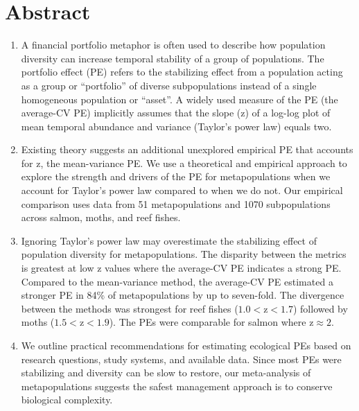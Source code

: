 %

\section{Abstract}
\begin{enumerate}
 \item A financial portfolio metaphor is often used to describe how population
   diversity can increase temporal stability of a group of populations. The
   portfolio effect (PE) refers to the stabilizing effect from a population
   acting as a group or ``portfolio'' of diverse subpopulations instead of a
   single homogeneous population or ``asset''. A widely used measure of the PE
   (the average-CV PE) implicitly assumes that the slope (z) of a log-log plot
   of mean temporal abundance and variance (Taylor's power law) equals two.

 \item Existing theory suggests an additional unexplored empirical PE that
   accounts for z, the mean-variance PE. We use a theoretical and empirical
   approach to explore the strength and drivers of the PE for metapopulations
   when we account for Taylor's power law compared to when we do not. Our
   empirical comparison uses data from 51 metapopulations and
   1070 subpopulations across salmon, moths, and reef fishes.

 \item Ignoring Taylor's power law may overestimate the stabilizing effect of
   population diversity for metapopulations. The disparity between the metrics
   is greatest at low z values where the average-CV PE indicates a strong PE.
   Compared to the mean-variance method, the average-CV PE estimated a stronger
   PE in 84\% of metapopulations by up to seven-fold. The divergence between
   the methods was strongest for reef fishes ($1.0 < \text{z} < 1.7$) followed
   by moths ($1.5 < \text{z} < 1.9$). The PEs were comparable for salmon where
   $\text{z} \approx 2$.

 \item We outline practical recommendations for estimating ecological PEs based
   on research questions, study systems, and available data. Since most PEs
   were stabilizing and diversity can be slow to restore, our meta-analysis of
   metapopulations suggests the safest management approach is to conserve
   biological complexity.

\end{enumerate}

